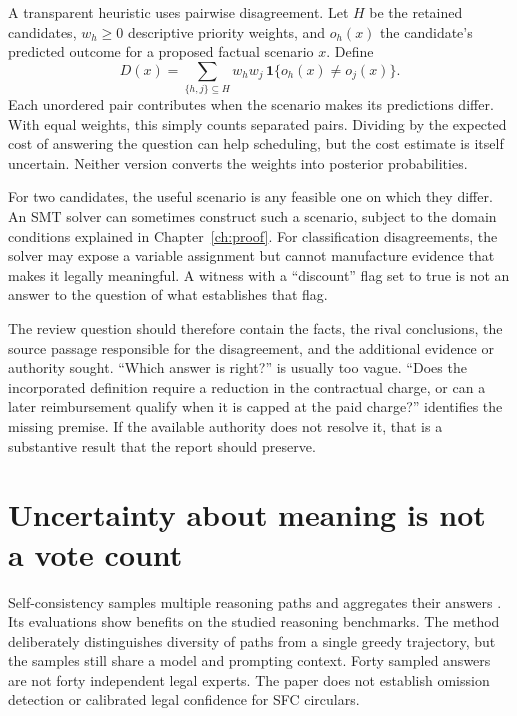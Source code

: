 A transparent heuristic uses pairwise disagreement. Let $H$ be the retained
candidates, $w_h\geq0$ descriptive priority weights, and $o_h(x)$ the candidate's
predicted outcome for a proposed factual scenario $x$. Define
\begin{equation}
 D(x)=\sum_{\{h,j\}\subseteq H}w_h w_j\,
       \mathbf{1}\{o_h(x)\ne o_j(x)\}.
 \label{eq:disagreement-question}
\end{equation}
Each unordered pair contributes when the scenario makes its predictions differ.
With equal weights, this simply counts separated pairs. Dividing by the expected
cost of answering the question can help scheduling, but the cost estimate is
itself uncertain. Neither version converts the weights into posterior
probabilities.

For two candidates, the useful scenario is any feasible one on which they differ.
An SMT solver can sometimes construct such a scenario, subject to the domain
conditions explained in Chapter~\ref{ch:proof}. For classification disagreements,
the solver may expose a variable assignment but cannot manufacture evidence that
makes it legally meaningful. A witness with a ``discount'' flag set to true is not
an answer to the question of what establishes that flag.

The review question should therefore contain the facts, the rival conclusions,
the source passage responsible for the disagreement, and the additional evidence
or authority sought. ``Which answer is right?'' is usually too vague. ``Does the
incorporated definition require a reduction in the contractual charge, or can a
later reimbursement qualify when it is capped at the paid charge?'' identifies
the missing premise. If the available authority does not resolve it, that is a
substantive result that the report should preserve.

\section{Uncertainty about meaning is not a vote count}

Self-consistency samples multiple reasoning paths and aggregates their answers
\citep[section 2]{selfconsistency2023}. Its evaluations show benefits on the
studied reasoning benchmarks. The method deliberately distinguishes diversity of
paths from a single greedy trajectory, but the samples still share a model and
prompting context. Forty sampled answers are not forty independent legal experts.
The paper does not establish omission detection or calibrated legal confidence
for SFC circulars.

